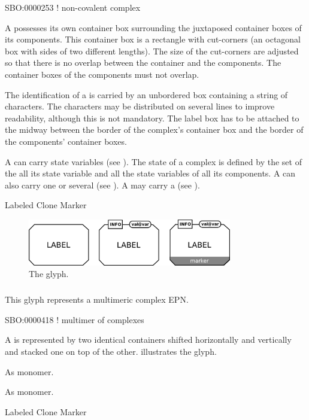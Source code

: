 \begin{glyphDescription}

\glyphSboTerm SBO:0000253 ! non-covalent complex

\glyphContainer A  possesses its own container box surrounding the juxtaposed container boxes of its components.  This container box is a rectangle with cut-corners (an octagonal box with sides of two different lengths).  The size of the cut-corners are adjusted so that there is no overlap between the container and the components.  The container boxes of the components must not overlap.

\glyphLabel The identification of a  is carried by an unbordered box containing a string of characters.  The characters may be distributed on several lines to improve readability, although this is not mandatory.  The label box has to be attached to the midway between the border of the complex's container box and the border of the components' container boxes.

\glyphAux A  can carry state variables (see ).  The state of a complex is defined by the set of the all its state variable and all the state variables of all its components.  A  can also carry one or several  (see ). A  may carry a  (see ).

\glyphCloning Labeled Clone Marker

\end{glyphDescription}


\begin{figure}[H]
  \centering
  \includegraphics[width=3.5in]{images/complexGlyph}
  \caption{The  glyph.}
  \label{fig:complex}
\end{figure}

\subparagraph{}

This glyph represents a multimeric complex EPN.

\begin{glyphDescription}

\glyphSboTerm SBO:0000418 ! multimer of complexes

\glyphContainer A  is represented by two
identical  containers shifted horizontally and
vertically and stacked one on top of the other.  
illustrates the glyph.

\glyphLabel As monomer.

\glyphAux As monomer.

\glyphCloning Labeled Clone Marker

\end{glyphDescription}


